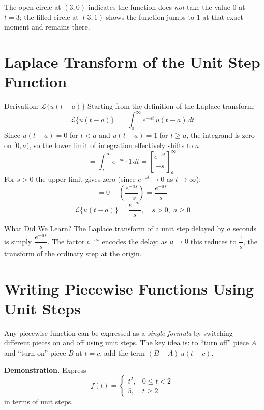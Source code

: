 \documentclass[12pt,a4paper]{article}
\begin{document}
The open circle at $(3, 0)$ indicates the function does \emph{not} take the value 0 at
$t = 3$; the filled circle at $(3, 1)$ shows the function jumps to 1 at that exact moment
and remains there.

\section{Laplace Transform of the Unit Step Function}

\begin{infobox}{Derivation: $\mathcal{L}\{u(t-a)\}$}
Starting from the definition of the Laplace transform:
\[
  \mathcal{L}\{u(t-a)\} \;=\; \int_0^{\infty} e^{-st}\, u(t-a)\, dt
\]
Since $u(t-a) = 0$ for $t < a$ and $u(t-a) = 1$ for $t \geq a$, the integrand is zero on
$[0, a)$, so the lower limit of integration effectively shifts to $a$:
\[
  = \int_a^{\infty} e^{-st} \cdot 1\, dt
  = \left[\frac{e^{-st}}{-s}\right]_a^{\infty}
\]
For $s > 0$ the upper limit gives zero (since $e^{-st} \to 0$ as $t \to \infty$):
\[
  = 0 - \left(\frac{e^{-as}}{-s}\right)
  = \frac{e^{-as}}{s}
\]
\[
  \boxed{\mathcal{L}\{u(t-a)\} = \frac{e^{-as}}{s}, \quad s > 0, \; a \geq 0}
\]
\end{infobox}

\begin{learnbox}{What Did We Learn?}
The Laplace transform of a unit step delayed by $a$ seconds is simply $\dfrac{e^{-as}}{s}$.
The factor $e^{-as}$ encodes the delay; as $a \to 0$ this reduces to $\dfrac{1}{s}$, the
transform of the ordinary step at the origin.
\end{learnbox}

\section{Writing Piecewise Functions Using Unit Steps}

Any piecewise function can be expressed as a \emph{single formula} by switching different
pieces on and off using unit steps.
The key idea is: to ``turn off'' piece $A$ and ``turn on'' piece $B$ at $t = c$, add the
term $(B - A)\,u(t - c)$.

\textbf{Demonstration.} Express
\[
  f(t) = \begin{cases} t^2, & 0 \leq t < 2 \\ 5, & t \geq 2 \end{cases}
\]
in terms of unit steps.
\end{document}
